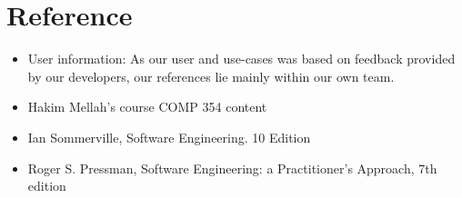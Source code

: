 \documentclass[11pt]{article}
\newcounter{use case ID}
\begin{document}
\printindex


\section{Reference}

\begin{itemize}
    \item User information: As our user and use-cases was based on feedback provided by our developers, our references lie mainly within our own team.
    \item Hakim Mellah's course COMP 354 content
    \item Ian Sommerville, Software Engineering. 10 Edition
    \item Roger S. Pressman, Software Engineering: a Practitioner's Approach, 7th edition
\end{itemize}
\end{document}
